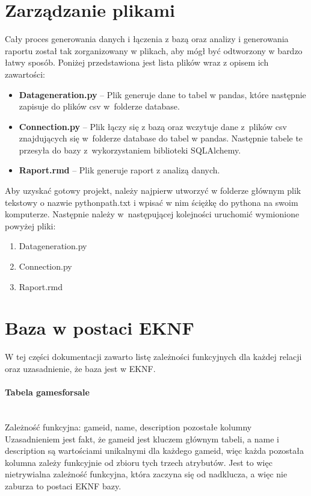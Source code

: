 \documentclass{article}
\begin{document}
	\section{Zarządzanie plikami}
	Cały proces generowania danych i łączenia z bazą oraz analizy i generowania raportu został tak zorganizowany w plikach, aby mógł być odtworzony w bardzo łatwy sposób. Poniżej przedstawiona jest lista plików wraz z opisem ich zawartości:
	\begin{itemize}
		\setlength{\itemsep}{-2pt}
		\item \textbf{Data\textunderscore generation.py} – Plik generuje dane to tabel w pandas, które następnie zapisuje do plików csv w~folderze database.
		\item \textbf{Connection.py} – Plik łączy się z bazą oraz wczytuje dane z~plików csv znajdujących się w~folderze database do tabel w pandas.
		Następnie tabele te przesyła do bazy z~wykorzystaniem biblioteki SQLAlchemy.
		\item \textbf{Raport.rmd} – Plik generuje raport z analizą danych.	
	\end{itemize}
	
	
	\noindent Aby uzyskać gotowy projekt, należy najpierw utworzyć w folderze głównym plik tekstowy o nazwie python\textunderscore path.txt i wpisać w nim ściężkę do pythona na swoim komputerze. Następnie należy w~następującej kolejności uruchomić wymionione powyżej pliki:
	\begin{enumerate}
		\setlength{\itemsep}{-2pt}
		\item Data\textunderscore generation.py
		\item Connection.py
		\item Raport.rmd
	\end{enumerate}
	
	\section{Baza w postaci EKNF}
	W tej części dokumentacji zawarto listę zależności funkcyjnych dla każdej relacji oraz uzasadnienie, że baza jest w EKNF.
	
	\paragraph{Tabela games\textunderscore for\textunderscore sale}\mbox{}\vspace{0.2cm} \\
	Zależność funkcyjna: \textbraceleft game\textunderscore id, name, description\textbraceright \mbox{} \textrightarrow \mbox{} pozostałe kolumny \vspace{0.2cm} \\
	\noindent Uzasadnieniem jest fakt, że game\textunderscore id jest kluczem głównym tabeli, a name i description są wartościami unikalnymi dla każdego game\textunderscore id, więc każda pozostała kolumna zależy funkcyjnie od zbioru tych trzech atrybutów. Jest to więc nietrywialna zależność funkcyjna, która zaczyna się od nadklucza, a więc nie zaburza to postaci EKNF bazy.
\end{document}
